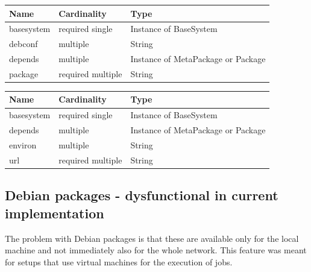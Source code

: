 \begin{table}[!h]
   \begin{center}
         \label{tab:main_class_debian}
	\begin{tabular}{p{3cm}p{3cm}p{6cm}}
	\textbf{Name}  & \textbf{Cardinality}  & \textbf{Type}\\
	\hline
	basesystem     & required single       & Instance of BaseSystem       \\
	debconf        & multiple              & String       \\
	depends        & multiple              & Instance of MetaPackage  or Package      \\
	package        & required multiple     & String      \\
	\end{tabular} 
   \end{center}
\end{table}

\begin{table}[!h]
   \begin{center}
         \label{tab:main_class_tar}
	\begin{tabular}{p{3cm}p{3cm}p{6cm}}
	\textbf{Name}  & \textbf{Cardinality}  & \textbf{Type}\\
	\hline
	basesystem     & required single       & Instance of BaseSystem       \\
	depends        & multiple              & Instance of MetaPackage or Package      \\
	environ        & multiple              & String       \\
	url            & required multiple     & String      \\
	\end{tabular} 
   \end{center}
\end{table}

\subsection{Debian packages - dysfunctional in current implementation}

The problem with Debian packages is that these are available only for the
local machine and not immediately also for the whole network. This feature
was meant for setups that use virtual machines for the execution of jobs.

